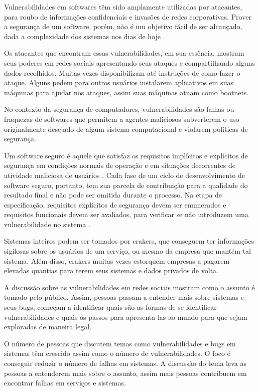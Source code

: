Vulnerabilidades em softwares têm sido amplamente utilizadas por atacantes, para roubo de informações confidenciais e invasões de redes corporativas. Prover a segurança de um software, porém, não é um objetivo fácil de ser alcançado, dada a complexidade dos sistemas nos dias de hoje \cite{Uto2009}.

Os atacantes que encontram essas vulnerabilidades, em sua essência, mostram seus poderes em redes sociais apresentando seus ataques e compartilhando alguns dados recolhidos. Muitas vezes disponibilizam até instruções de como fazer o ataque. Alguns pedem para outros usuários instalarem aplicativos em suas máquinas para ajudar nos ataques, assim suas máquinas atuam como bootnets.

No contexto da segurança de computadores, vulnerabilidades são falhas ou fraquezas de softwares que permitem a agentes maliciosos subverterem o uso originalmente desejado de algum sistema computacional e violarem políticas de segurança. 

Um software seguro é aquele que satisfaz os requisitos implícitos e explícitos de segurança em condições normais de operação e em situações decorrentes de atividade maliciosa de usuários \cite{Uto2009}. Cada fase de um ciclo de desenvolvimento de software seguro, portanto, tem sua parcela de contribuição para a qualidade do resultado final e não pode ser omitida durante o processo. Na etapa de especificação, requisitos explícitos de segurança devem ser enumerados e requisitos funcionais devem ser avaliados, para verificar se não introduzem uma vulnerabilidade no sistema \cite{Uto2009}.

Sistemas inteiros podem ser tomados por crakers, que conseguem ter informações sigilosas sobre os usuários de um serviço, ou mesmo da empresa que mantém tal sistema. Além disso, crakers muitas vezes estorquem empresas a pagarem elevadas quantias para terem seus sistemas e dados privados de volta. 

A discussão sobre as vulnerabilidades em redes sociais mostram como o assunto é tomado pelo público. Assim, pessoas passam a entender mais sobre sistemas e seus bugs, começam a identificar quais são as formas de se identificar vulnerabilidades e quais os passos para apresenta-las ao mundo para que sejam exploradas de maneira legal.

O número de pessoas que discutem temas como vulnerabilidades e bugs em sistemas têm crescido assim como o número de vulnerabilidades. O foco é conseguir reduzir o número de falhas em sistemas. A discussão do tema leva as pessoas a entenderem mais sobre o assunto, assim mais pessoas contribuem em encontrar falhas em serviços e sistemas.

